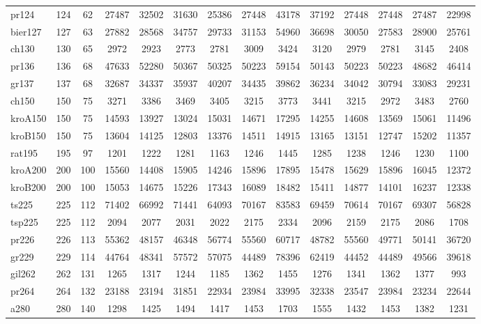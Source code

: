 \begin{table}[htbp]
{{\begin{tabular}{|l|c|c|c|c|c|c|c|c|c|c|c|c|c|}
pr124 & 124 & 62 & 27487 & 32502 & 31630 & 25386 & 27448 & 43178 & 37192 & 27448 & 27448 & 27487 & 22998 \\
bier127 & 127 & 63 & 27882 & 28568 & 34757 & 29733 & 31153 & 54960 & 36698 & 30050 & 27583 & 28900 & 25761 \\
ch130 & 130 & 65 & 2972 & 2923 & 2773 & 2781 & 3009 & 3424 & 3120 & 2979 & 2781 & 3145 & 2408 \\
pr136 & 136 & 68 & 47633 & 52280 & 50367 & 50325 & 50223 & 59154 & 50143 & 50223 & 50223 & 48682 & 46414 \\
gr137 & 137 & 68 & 32687 & 34337 & 35937 & 40207 & 34435 & 39862 & 36234 & 34042 & 30794 & 33083 & 29231 \\
ch150 & 150 & 75 & 3271 & 3386 & 3469 & 3405 & 3215 & 3773 & 3441 & 3215 & 2972 & 3483 & 2760 \\
kroA150 & 150 & 75 & 14593 & 13927 & 13024 & 15031 & 14671 & 17295 & 14255 & 14608 & 13569 & 15061 & 11496 \\
kroB150 & 150 & 75 & 13604 & 14125 & 12803 & 13376 & 14511 & 14915 & 13165 & 13151 & 12747 & 15202 & 11357 \\
rat195 & 195 & 97 & 1201 & 1222 & 1281 & 1163 & 1246 & 1445 & 1285 & 1238 & 1246 & 1230 & 1100 \\
kroA200 & 200 & 100 & 15560 & 14408 & 15905 & 14246 & 15896 & 17895 & 15478 & 15629 & 15896 & 16045 & 12372 \\
kroB200 & 200 & 100 & 15053 & 14675 & 15226 & 17343 & 16089 & 18482 & 15411 & 14877 & 14101 & 16237 & 12338 \\
ts225 & 225 & 112 & 71402 & 66992 & 71441 & 64093 & 70167 & 83583 & 69459 & 70614 & 70167 & 69307 & 56828 \\
tsp225 & 225 & 112 & 2094 & 2077 & 2031 & 2022 & 2175 & 2334 & 2096 & 2159 & 2175 & 2086 & 1708 \\
pr226 & 226 & 113 & 55362 & 48157 & 46348 & 56774 & 55560 & 60717 & 48782 & 55560 & 49771 & 50141 & 36720 \\
gr229 & 229 & 114 & 44764 & 48341 & 57572 & 57075 & 44489 & 78396 & 62419 & 44452 & 44489 & 49566 & 39618 \\
gil262 & 262 & 131 & 1265 & 1317 & 1244 & 1185 & 1362 & 1455 & 1276 & 1341 & 1362 & 1377 & 993 \\
pr264 & 264 & 132 & 23188 & 23194 & 31851 & 22934 & 23984 & 33995 & 32338 & 23547 & 23984 & 23234 & 22644 \\
a280 & 280 & 140 & 1298 & 1425 & 1494 & 1417 & 1453 & 1703 & 1555 & 1432 & 1453 & 1382 & 1231 \\

\end{tabular}}}
\end{table}
